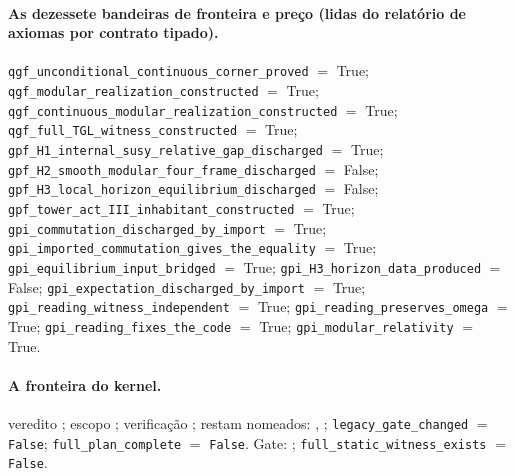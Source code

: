 \documentclass[11pt]{article}
\theoremstyle{definition}\newtheorem{deriv}{Derivação}
\begin{document}
\paragraph*{As dezessete bandeiras de fronteira e preço (lidas do relatório de axiomas por contrato tipado).} \texttt{qgf\_unconditional\_continuous\_corner\_proved} $=$ True; \texttt{qgf\_modular\_realization\_constructed} $=$ True; \texttt{qgf\_continuous\_modular\_realization\_constructed} $=$ True; \texttt{qgf\_full\_TGL\_witness\_constructed} $=$ True; \texttt{gpf\_H1\_internal\_susy\_relative\_gap\_discharged} $=$ True; \texttt{gpf\_H2\_smooth\_modular\_four\_frame\_discharged} $=$ False; \texttt{gpf\_H3\_local\_horizon\_equilibrium\_discharged} $=$ False; \texttt{gpf\_tower\_act\_III\_inhabitant\_constructed} $=$ True; \texttt{gpi\_commutation\_discharged\_by\_import} $=$ True; \texttt{gpi\_imported\_commutation\_gives\_the\_equality} $=$ True; \texttt{gpi\_equilibrium\_input\_bridged} $=$ True; \texttt{gpi\_H3\_horizon\_data\_produced} $=$ False; \texttt{gpi\_expectation\_discharged\_by\_import} $=$ True; \texttt{gpi\_reading\_witness\_independent} $=$ True; \texttt{gpi\_reading\_preserves\_omega} $=$ True; \texttt{gpi\_reading\_fixes\_the\_code} $=$ True; \texttt{gpi\_modular\_relativity} $=$ True.

\paragraph*{A fronteira do kernel.} veredito ; escopo ; verificação ; restam nomeados: , ; \texttt{legacy\_gate\_changed} $=$ \texttt{False}; \texttt{full\_plan\_complete} $=$ \texttt{False}. Gate: ; \texttt{full\_static\_witness\_exists} $=$ \texttt{False}.
\end{document}
